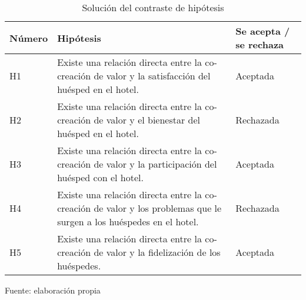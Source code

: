 \begin{table}[h]
    \caption {Solución del contraste de hipótesis}
	\label{tab:hipotesis}
	\setlength\extrarowheight{5pt}
	
	\begin{tabular}{p{2.1cm} p{9.7cm} p{2.3cm}}
	\toprule
	Número	& Hipótesis	& Se acepta / se rechaza \\
	\midrule
	H1 & Existe una relación directa entre la co-creación de valor y la satisfacción del huésped en el hotel.	& Aceptada \\
	H2 & Existe una relación directa entre la co-creación de valor y el bienestar del huésped en el hotel.	& Rechazada \\
	H3 & Existe una relación directa entre la co-creación de valor y la participación del huésped con el hotel.	& Aceptada \\
	H4 & Existe una relación directa entre la co-creación de valor y los problemas que le surgen a los huéspedes en el hotel.	& Rechazada \\
	H5 & Existe una relación directa entre la co-creación de valor y la fidelización de los huéspedes.	& Aceptada \\	
	\bottomrule
	\end{tabular}
	
	\center
	\footnotesize
	Fuente: elaboración propia
\end{table}
